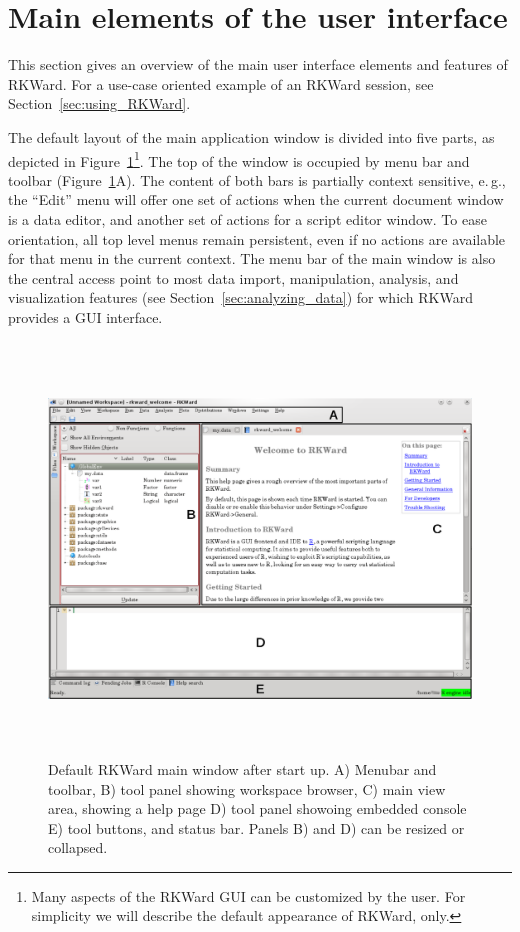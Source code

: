 \section{Main elements of the user interface}
\label{sec:user_interface}
This section gives an overview of the main user interface elements and features of RKWard.
For a use-case oriented example of an RKWard session, see Section~\ref{sec:using_RKWard}.

The default layout of the main application window is divided into five
parts, as depicted in Figure~\ref{fig:main_window}\footnote{
 Many aspects of the RKWard GUI can be customized by the user. For simplicity we will
 describe the default appearance of RKWard, only.
}. The top of the window is occupied by menu bar and toolbar 
(Figure~\ref{fig:main_window}A). The content of both bars is partially context
sensitive, e.\,g., the ``Edit'' menu will offer
one set of actions when the current document window is a data editor,
and another set of actions for a  script
editor window. To ease orientation, all top level menus remain
persistent, even if no actions are available for that menu in the
current context. The menu bar of the main window is also the central
access point to most data import, manipulation, analysis, and
visualization features (see Section~\ref{sec:analyzing_data}) for which RKWard provides a GUI
interface.

\begin{figure}[htp]
 \centering
 \includegraphics[width=15.446cm,height=10.949cm]{../figures/main_window.png}
 \caption{Default RKWard main window after start up. 
A) Menubar and toolbar, B) tool panel showing workspace browser, C) main view area, showing
a help page D) tool panel showoing embedded  console E) tool buttons, and status bar.
Panels B) and D) can be resized or collapsed.}
 \label{fig:main_window}
\end{figure}

